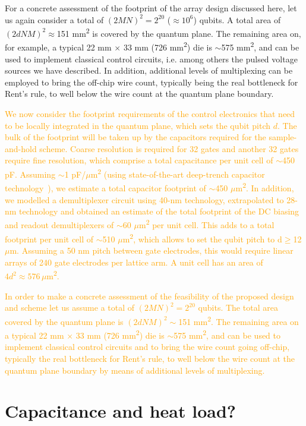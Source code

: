 \documentclass[aps,prl,reprint,superscriptaddress,floatfix]{revtex4-1}
\begin{document}
For a concrete assessment of the footprint of the array design discussed here, let us again consider a total of $(2MN)^2 = 2^{20}$ ($\approx10^6$) qubits.
A total area of $(2dNM)^2\approx$151 mm\textsuperscript{2} is covered by the quantum plane.
The remaining area on, for example, a typical 22 mm $\times$ 33 mm (726 mm\textsuperscript{2}) die is $\sim$575 mm\textsuperscript{2}, and can be used to implement classical control circuits, i.e. among others the pulsed voltage sources we have described.
In addition, additional levels of multiplexing can be employed to bring the off-chip wire count, typically being the real bottleneck for Rent’s rule, to well below the wire count at the quantum plane boundary.

\textcolor{orange}{We now consider the footprint requirements of the control electronics that need to be locally integrated in the quantum plane, which sets the qubit pitch $d$.
The bulk of the footprint will be taken up by the capacitors required for the sample-and-hold scheme.
Coarse resolution is required for 32 gates and another 32 gates require fine resolution, which comprise a total capacitance per unit cell of $\sim$450 pF. 
Assuming $\sim$1 pF/$\mu$m\textsuperscript{2} (using state-of-the-art deep-trench capacitor technology~\cite{Park2015}), we estimate a total capacitor footprint of $\sim$450 $\mu$m\textsuperscript{2}.
In addition, we modelled a demultiplexer circuit using 40-nm technology, extrapolated to 28-nm technology and obtained an estimate of the total footprint of the DC biasing and readout demultiplexers of $\sim$60 $\mu$m\textsuperscript{2} per unit cell.
This adds to a total footprint per unit cell of $\sim$510 $\mu$m\textsuperscript{2}, which allows to set the qubit pitch to d$\geq$12 $\mu$m.
Assuming a 50 nm pitch between gate electrodes, this would require linear arrays of 240 gate electrodes per lattice arm.
A unit cell has an area of $4d^2\approx576 \,\mu$m\textsuperscript{2}.%
}

\textcolor{orange}{In order to make a concrete assessment of the feasibility of the proposed design and scheme let us assume a total of $(2MN)^2 = 2^{20}$ qubits.
The total area covered by the quantum plane is $(2dNM)^2\sim$151 mm\textsuperscript{2}.
The remaining area on a typical 22 mm $\times$ 33 mm (726 mm\textsuperscript{2}) die is $\sim$575 mm\textsuperscript{2}, and can be used to implement classical control circuits and to bring the wire count going off-chip, typically the real bottleneck for Rent’s rule, to well below the wire count at the quantum plane boundary by means of additional levels of multiplexing.
}


\section{Capacitance and heat load?}














\begin{acknowledgments}

\end{acknowledgments}



\end{document}
